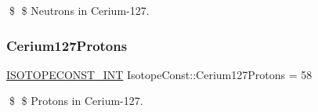 \$ \$ Neutrons in Cerium-\/127. \mbox{\label{group___isotope_const-_cerium-_ce127_ga9aa348093bdf331bca0ed32f12cb8aa5}} 
\subsubsection{\texorpdfstring{Cerium127\+Protons}{Cerium127Protons}}
{\footnotesize\ttfamily \mbox{\hyperlink{group___isotope_const-_macros_ga5f18360b3e99483a35c32d789e62621c}{I\+S\+O\+T\+O\+P\+E\+C\+O\+N\+S\+T\+\_\+\+I\+NT}} Isotope\+Const\+::\+Cerium127\+Protons = 58}

\$ \$ Protons in Cerium-\/127. 